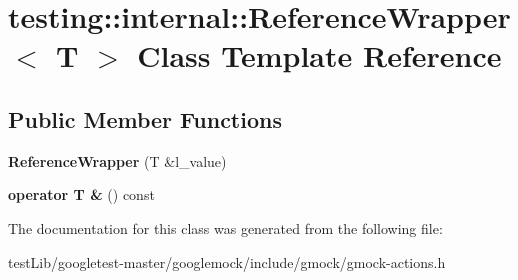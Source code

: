 \hypertarget{classtesting_1_1internal_1_1ReferenceWrapper}{}\section{testing\+:\+:internal\+:\+:Reference\+Wrapper$<$ T $>$ Class Template Reference}
\label{classtesting_1_1internal_1_1ReferenceWrapper}
\subsection*{Public Member Functions}
\begin{DoxyCompactItemize}
\item 
\mbox{\label{classtesting_1_1internal_1_1ReferenceWrapper_ad33597ffc478c3af9190d1a288a76d39}} 
{\bfseries Reference\+Wrapper} (T \&l\+\_\+value)
\item 
\mbox{\label{classtesting_1_1internal_1_1ReferenceWrapper_a187d6e6ffb4031444fff10dee7dc7de8}} 
{\bfseries operator T \&} () const
\end{DoxyCompactItemize}


The documentation for this class was generated from the following file\+:\begin{DoxyCompactItemize}
\item 
test\+Lib/googletest-\/master/googlemock/include/gmock/gmock-\/actions.\+h\end{DoxyCompactItemize}
